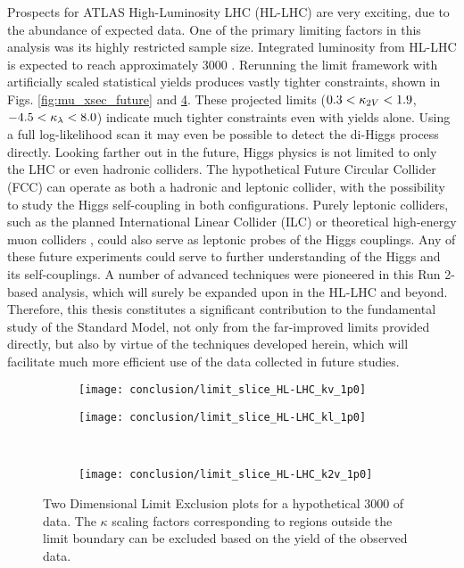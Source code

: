 Prospects for ATLAS High-Luminosity LHC (HL-LHC) are very exciting, due to the abundance of expected data.
One of the primary limiting factors in this analysis was its highly restricted sample size.
Integrated luminosity from HL-LHC is expected to reach approximately 3000 \ifb.
Rerunning the limit framework with artificially scaled statistical yields produces vastly tighter constraints,
    shown in Figs. \ref{fig:mu_xsec_future} and \ref{fig:limit_slices_future}.
These projected limits 
    ($0.3<\kappa_{2V}<1.9$, $-4.5<\kappa_{\lambda}<8.0$)
    indicate much tighter constraints even with yields alone.
Using a full log-likelihood scan it may even be possible to detect the di-Higgs process directly.
Looking farther out in the future, Higgs physics is not limited to only the LHC or even hadronic colliders.
The hypothetical Future Circular Collider (FCC) \cite{Taliercio:2022maa} can operate as both a hadronic and leptonic collider,
    with the possibility to study the Higgs self-coupling in both configurations.
Purely leptonic colliders, such as the planned International Linear Collider (ILC) \cite{Apresyan:2022tqw} 
    or theoretical high-energy muon colliders \cite{Chiesa:2021qpr},
    could also serve as leptonic probes of the Higgs couplings.
Any of these future experiments could serve to further understanding of the Higgs and its self-couplings.
A number of advanced techniques were pioneered in this Run 2-based analysis,
    which will surely be expanded upon in the HL-LHC and beyond.
Therefore, this thesis constitutes a significant contribution to the fundamental study of the Standard Model,
    not only from the far-improved limits provided directly,
    but also by virtue of the techniques developed herein,
    which will facilitate much more efficient use of the data collected in future studies.


\begin{figure}
    \centering
    \begin{subfigure}{0.48\textwidth} 
        \texttt{[image: conclusion/limit\_slice\_HL-LHC\_kv\_1p0]}
        \caption{}
        \label{fig:limit_slice_kv_1p0_future}
    \end{subfigure}
    \begin{subfigure}{0.48\textwidth}
        \texttt{[image: conclusion/limit\_slice\_HL-LHC\_kl\_1p0]}
        \caption{}
        \label{fig:limit_slice_kl_1p0_future}
    \end{subfigure}\\
    \begin{subfigure}{0.48\textwidth} 
        \texttt{[image: conclusion/limit\_slice\_HL-LHC\_k2v\_1p0]}
        \caption{}
        \label{fig:limit_slice_k2v_1p0_future}
    \end{subfigure}
    \caption{
        Two Dimensional Limit Exclusion plots for a hypothetical 3000 \ifb of data.
        The $\kappa$ scaling factors corresponding to regions outside the limit boundary
            can be excluded based on the yield of the observed data.
    }
    \label{fig:limit_slices_future}
\end{figure}


